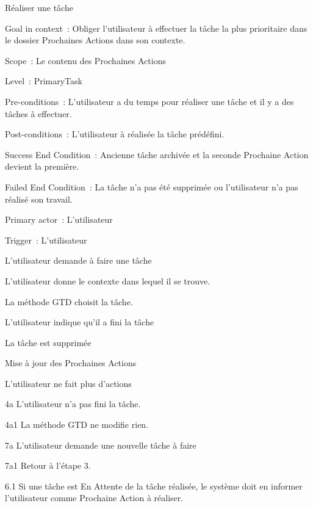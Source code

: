 \begin{usecase}{Réaliser une tâche}
\begin{information}
\item[Goal in context~:] Obliger l'utilisateur à effectuer la tâche la plus prioritaire dans le dossier Prochaines Actions dans son contexte.
\item[Scope~:] Le contenu des Prochaines Actions
\item[Level~:] PrimaryTask
\item[Pre-conditions~:] L'utilisateur a du temps pour réaliser une tâche et il y a des tâches à effectuer.
\item[Post-conditions~:] L'utilisateur à réalisée la tâche prédéfini.
\item[Success End Condition~:] Ancienne tâche archivée et la seconde Prochaine Action devient la première.
\item[Failed End Condition~:] La tâche n'a pas été supprimée ou l'utilisateur n'a pas réalisé son travail.
\item[Primary actor~:] L'utilisateur
\item[Trigger~:] L'utilisateur
\\
\end{information}
\begin{scenario}
\item L'utilisateur demande à faire une tâche
\item L'utilisateur donne le contexte dans lequel il se trouve.
\item La méthode GTD choisit la tâche.
\item L'utilisateur indique qu'il a fini la tâche
\item La tâche est supprimée
\item Mise à jour des Prochaines Actions
\item L'utilisateur ne fait plus d'actions
\\
\end{scenario}
\begin{extension}
\item[4a] L'utilisateur n'a pas fini la tâche.
\item[4a1] La méthode GTD ne modifie rien.
\item[7a] L'utilisateur demande une nouvelle tâche à faire
\item[7a1] Retour à l'étape 3.
\\
\end{extension}
\begin{variation}
\item[6.1] Si une tâche est En Attente de la tâche réalisée, le système doit en informer l'utilisateur comme Prochaine Action à réaliser.

\end{variation}
\end{usecase}
